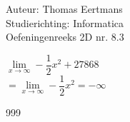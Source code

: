 \documentclass[a4paper]{article}
\begin{document}
  
\noindent \large Auteur: Thomas Eertmans \\
\noindent \large Studierichting: Informatica\\
\noindent \large Oefeningenreeks 2D nr. 8.3\\

\medskip

\normalsize

$\lim\limits_{x\rightarrow\infty} -\dfrac{1}{2}x^2+27868$ \\

$= \lim\limits_{x\rightarrow\infty} -\dfrac{1}{2}x^2 = -\infty$ \\

\begin{thebibliography}{999}
\end{thebibliography}
\end{document}
